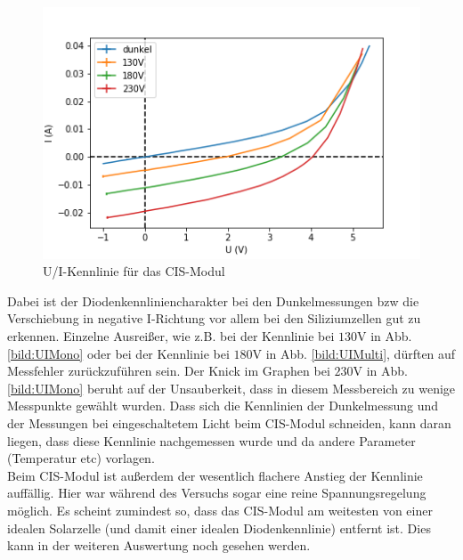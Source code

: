 \begin{figure}[h]
    \centering
    \includegraphics[scale=0.75]{Bilder/UICIS.png}
    \caption{U/I-Kennlinie für das CIS-Modul}
    \label{bild:UICIS}
\end{figure}

Dabei ist der Diodenkennliniencharakter bei den Dunkelmessungen bzw die Verschiebung in negative I-Richtung vor allem bei den 
Siliziumzellen gut zu erkennen. Einzelne Ausreißer, wie z.B. bei der Kennlinie bei $130$V in Abb. \ref{bild:UIMono} oder bei der 
Kennlinie bei $180$V in Abb. \ref{bild:UIMulti}, dürften auf Messfehler zurückzuführen sein. Der Knick im Graphen bei $230$V in Abb.
\ref{bild:UIMono} beruht auf der Unsauberkeit, dass in diesem Messbereich zu wenige Messpunkte gewählt wurden. Dass sich die Kennlinien 
der Dunkelmessung und der Messungen bei eingeschaltetem Licht beim CIS-Modul schneiden, kann daran liegen, dass diese Kennlinie 
nachgemessen wurde und da andere Parameter (Temperatur etc) vorlagen.\\
Beim CIS-Modul ist außerdem der wesentlich flachere Anstieg der Kennlinie auffällig. Hier war während des Versuchs sogar eine reine 
Spannungsregelung möglich. Es scheint zumindest so, dass das CIS-Modul am weitesten von einer idealen Solarzelle (und damit einer 
idealen Diodenkennlinie) entfernt ist. Dies kann in der weiteren Auswertung noch gesehen werden.

